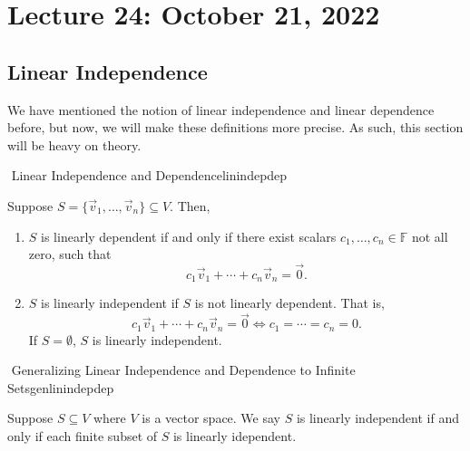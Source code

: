 \pagebreak

\section{Lecture 24: October 21, 2022}

    \subsection{Linear Independence}

        We have mentioned the notion of linear independence and linear dependence before, but now, we will make these definitions more precise. As such, this section will be heavy on theory.
        \begin{definition}{\Stop\,\,Linear Independence and Dependence}{linindepdep}
            
            Suppose \(S=\{\vec{v}_1,\ldots,\vec{v}_n\}\subseteq V\). Then,
            \begin{enumerate}
                \item \(S\) is linearly dependent if and only if there exist scalars \(c_1,\ldots,c_n\in\mathbb{F}\) not all zero, such that
                \begin{equation*}
                    c_1\vec{v}_1+\cdots+c_n\vec{v}_n=\vec{0}.
                \end{equation*}
                \item \(S\) is linearly independent if \(S\) is not linearly dependent. That is,
                \begin{equation*}
                    c_1\vec{v}_1+\cdots+c_n\vec{v}_n=\vec{0} \iff c_1=\cdots=c_n=0.
                \end{equation*}
                If \(S=\emptyset\), \(S\) is linearly independent.
            \end{enumerate}

        \end{definition}
        \begin{definition}{\Stop\,\,Generalizing Linear Independence and Dependence to Infinite Sets}{genlinindepdep}
            
            Suppose \(S\subseteq V\) where \(V\) is a vector space. We say \(S\) is linearly independent if and only if each finite subset of \(S\) is linearly idependent.

        \end{definition}
        \vphantom
        \\
        \\
